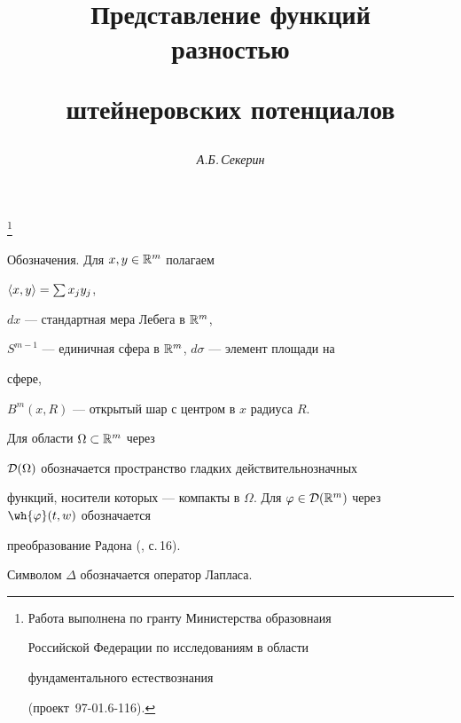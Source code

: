 \author{\it А.Б.\,Секерин}




\title{Представление функций\\ разностью


штейнеровских потенциалов}


\thanks{Работа выполнена по гранту Министерства образовнаия


Российской Федерации по исследованиям в области


фундаментального естествознания


(проект \No\,97-01.6-116).}





\date{}




\pagestyle{plain} %







\maketitle


\label{begin}








Обозначения. Для $x,y \in{\Bbb R}^{m}$ полагаем 


$\langle x,y\rangle =\sum x_{j}y_{j}$,


$dx$ --- стандартная мера Лебега в  ${\Bbb R}^{m}$, 


$S^{m-1}$ --- единичная сфера в ${\Bbb R}^{m}$, $d\sigma$ --- элемент площади на 


сфере,


$B^m(x,R)$ --- открытый шар с центром в $x$ радиуса $R$. 


Для области $\Omega \subset \Bbb R^{m}$ через 


${\cal D}(\Omega)$ обозначается пространство гладких действительнозначных


функций, носители которых --- компакты в $\Omega$. Для $\varphi\in


{\cal D}(\BR^m)$ через $\wh{\varphi}(t,w)$  обозначается


преобразование Радона (\cite{Gelfand}, с.\,16).


Символом $\Delta$ обозначается оператор Лапласа. 





